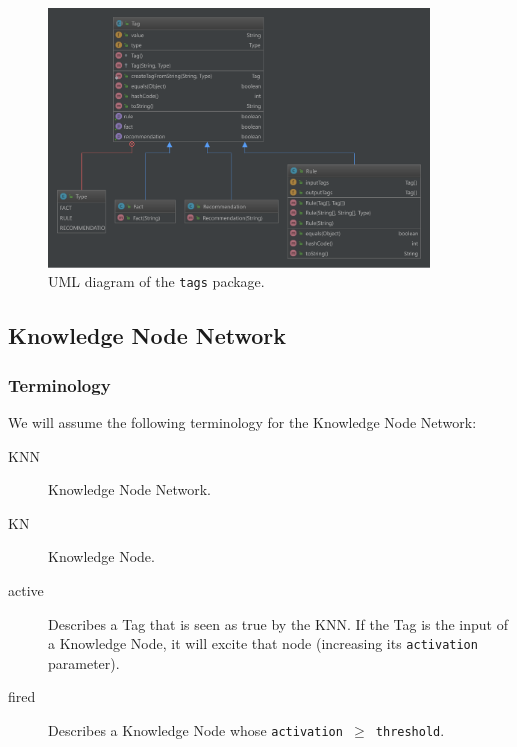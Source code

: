 \documentclass{beamer}
\newcommand{\code}[1]{\texttt{#1}}
\begin{document}
	\begin{frame}
		\begin{figure}
			\centering
			\includegraphics[width=0.9\textwidth]{figures/uml_tags.pdf}
			\caption
			{UML diagram of the \code{tags} package.}
			\label{fig:uml_tags}
		\end{figure}
	\end{frame}
	
	\subsection{Knowledge Node Network}
	
	\begin{frame}
		\frametitle{Terminology}
		We will assume the following terminology for the Knowledge Node Network:
		\begin{description}
			\item[KNN] Knowledge Node Network.
			\item[KN] Knowledge Node.
			\item[active] Describes a Tag that is seen as true by the KNN. If the Tag is the input of a Knowledge Node, it will excite that node (increasing its \code{activation} parameter).
			\item[fired] Describes a Knowledge Node whose \code{activation $\geq$ threshold}.
		\end{description}
	\end{frame}
\end{document}
